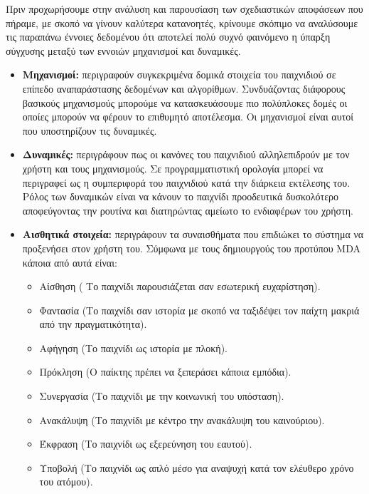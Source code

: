 		Πριν προχωρήσουμε στην ανάλυση και παρουσίαση των σχεδιαστικών αποφάσεων που πήραμε, με σκοπό να γίνουν καλύτερα κατανοητές, κρίνουμε σκόπιμο να αναλύσουμε τις παραπάνω έννοιες δεδομένου ότι αποτελεί πολύ συχνό φαινόμενο η ύπαρξη σύγχυσης μεταξύ των εννοιών μηχανισμοί και δυναμικές.
		\begin{itemize}
		
			\item \textbf{Μηχανισμοί:} περιγραφούν συγκεκριμένα δομικά στοιχεία του παιχνιδιού σε επίπεδο αναπαράστασης δεδομένων και αλγορίθμων. Συνδυάζοντας διάφορους βασικούς μηχανισμούς μπορούμε να κατασκευάσουμε πιο πολύπλοκες δομές οι οποίες μπορούν να φέρουν το επιθυμητό αποτέλεσμα. Οι μηχανισμοί είναι αυτοί που υποστηρίζουν τις δυναμικές.
			
			\item \textbf{Δυναμικές:} περιγράφουν πως οι κανόνες του παιχνιδιού αλληλεπιδρούν με τον χρήστη και τους μηχανισμούς. Σε προγραμματιστική ορολογία μπορεί να περιγραφεί ως η συμπεριφορά του παιχνιδιού κατά την διάρκεια εκτέλεσης του. Ρόλος των δυναμικών είναι να κάνουν το παιχνίδι προοδευτικά δυσκολότερο αποφεύγοντας την ρουτίνα και διατηρώντας αμείωτο το ενδιαφέρων του χρήστη.
			\item \textbf{Αισθητικά στοιχεία:} περιγράφουν τα συναισθήματα που επιδιώκει το σύστημα να προξενήσει στον χρήστη του. Σύμφωνα με τους δημιουργούς του προτύπου MDA κάποια από αυτά είναι:
			
			\begin{itemize}
				\item Αίσθηση ( Το παιχνίδι παρουσιάζεται σαν εσωτερική ευχαρίστηση).
				\item Φαντασία (Το παιχνίδι σαν ιστορία με σκοπό να ταξιδέψει τον παίχτη μακριά από την πραγματικότητα).
				\item Αφήγηση (Το παιχνίδι ως ιστορία με πλοκή).
				\item Πρόκληση (Ο παίκτης πρέπει να ξεπεράσει κάποια εμπόδια).
				\item Συνεργασία (Το παιχνίδι με την κοινωνική του υπόσταση).
				\item Ανακάλυψη (Το παιχνίδι με κέντρο την ανακάλυψη του καινούριου).
				\item Έκφραση (Το παιχνίδι ως εξερεύνηση του εαυτού).
				\item Υποβολή (Το παιχνίδι ως απλό μέσο για αναψυχή κατά τον ελέυθερο χρόνο
	του ατόμου).
	
			\end{itemize}
		\end{itemize}
		
